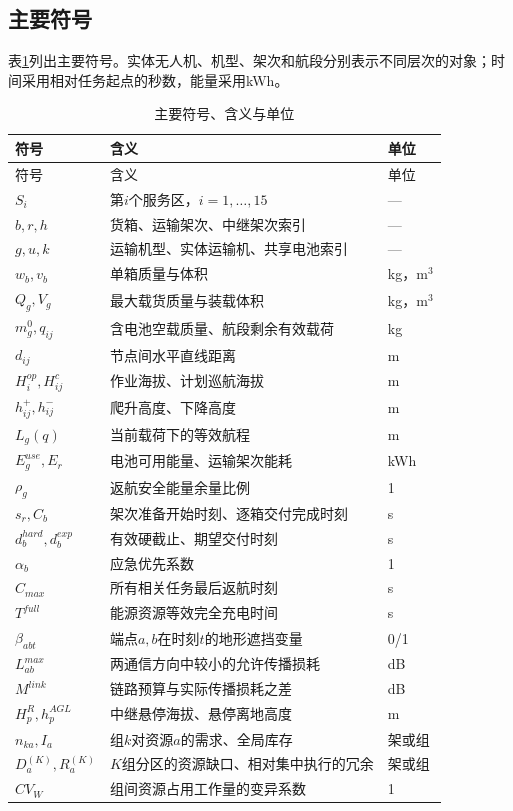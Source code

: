 \subsection{主要符号}
表\ref{tab:symbols}列出主要符号。实体无人机、机型、架次和航段分别表示不同层次的对象；时间采用相对任务起点的秒数，能量采用kWh。
\begin{longtable}{p{2.8cm}p{8.5cm}p{1.8cm}}
\caption{主要符号、含义与单位}\label{tab:symbols}\\
\toprule 符号 & 含义 & 单位\\\midrule\endfirsthead
\toprule 符号 & 含义 & 单位\\\midrule\endhead
$S_i$ & 第$i$个服务区，$i=1,\ldots,15$ & —\\
$b,r,h$ & 货箱、运输架次、中继架次索引 & —\\
$g,u,k$ & 运输机型、实体运输机、共享电池索引 & —\\
$w_b,v_b$ & 单箱质量与体积 & kg，m$^3$\\
$Q_g,V_g$ & 最大载货质量与装载体积 & kg，m$^3$\\
$m_g^0,q_{ij}$ & 含电池空载质量、航段剩余有效载荷 & kg\\
$d_{ij}$ & 节点间水平直线距离 & m\\
$H_i^{op},H_{ij}^{c}$ & 作业海拔、计划巡航海拔 & m\\
$h_{ij}^{+},h_{ij}^{-}$ & 爬升高度、下降高度 & m\\
$L_g(q)$ & 当前载荷下的等效航程 & m\\
$E_g^{use},E_r$ & 电池可用能量、运输架次能耗 & kWh\\
$\rho_g$ & 返航安全能量余量比例 & 1\\
$s_r,C_b$ & 架次准备开始时刻、逐箱交付完成时刻 & s\\
$d_b^{hard},d_b^{exp}$ & 有效硬截止、期望交付时刻 & s\\
$\alpha_b$ & 应急优先系数 & 1\\
$C_{max}$ & 所有相关任务最后返航时刻 & s\\
$T^{full}$ & 能源资源等效完全充电时间 & s\\
$\beta_{abt}$ & 端点$a,b$在时刻$t$的地形遮挡变量 & 0/1\\
$L_{ab}^{max}$ & 两通信方向中较小的允许传播损耗 & dB\\
$M^{link}$ & 链路预算与实际传播损耗之差 & dB\\
$H_p^R,h_p^{AGL}$ & 中继悬停海拔、悬停离地高度 & m\\
$n_{ka},I_a$ & 组$k$对资源$a$的需求、全局库存 & 架或组\\
$D_a^{(K)},R_a^{(K)}$ & $K$组分区的资源缺口、相对集中执行的冗余 & 架或组\\
$CV_W$ & 组间资源占用工作量的变异系数 & 1\\
\bottomrule\end{longtable}
